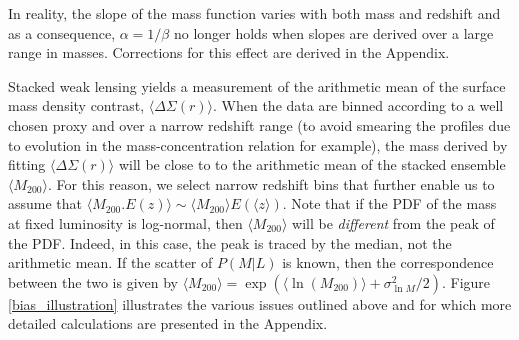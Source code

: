 \documentclass[12pt]{emulateapj}
\begin{document}
In reality, the slope of the mass function varies with both mass and
redshift and as a consequence, $\alpha=1/\beta$ no longer holds when
slopes are derived over a large range in masses. Corrections for this
effect are derived in the Appendix.

Stacked weak lensing yields a measurement of the arithmetic mean of
the surface mass density contrast, $\langle \Delta\Sigma(r)
\rangle$. When the data are binned according to a well chosen proxy
and over a narrow redshift range (to avoid smearing the profiles due
to evolution in the mass-concentration relation for example), the mass
derived by fitting $\langle \Delta\Sigma(r) \rangle$ will be close to
to the arithmetic mean of the stacked ensemble $\langle M_{200}
\rangle$. For this reason, we select narrow redshift bins that further
enable us to assume that $\langle M_{200}.E(z) \rangle \sim \langle
M_{200}\rangle E(\langle z \rangle)$. Note that if the PDF of the mass
at fixed luminosity is log-normal, then $\langle M_{200} \rangle$ will
be {\em different} from the peak of the PDF. Indeed, in this case, the
peak is traced by the median, not the arithmetic mean. If the scatter
of $P(M|L)$ is known, then the correspondence between the two is given
by $\langle M_{200} \rangle=\exp (\langle \ln (M_{200})
\rangle+\sigma_{\ln M}^2/2)$. Figure \ref{bias_illustration}
illustrates the various issues outlined above and for which more
detailed calculations are presented in the Appendix.
\end{document}
